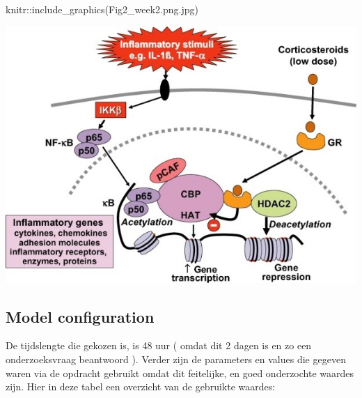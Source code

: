 \documentclass[
]{article}
\newenvironment{Shaded}{\begin{snugshade}}{\end{snugshade}}
\newcommand{\FunctionTok}[1]{\textcolor[rgb]{0.00,0.00,0.00}{#1}}
\newcommand{\NormalTok}[1]{#1}
\newcommand{\SpecialCharTok}[1]{\textcolor[rgb]{0.00,0.00,0.00}{#1}}
\newcommand{\StringTok}[1]{\textcolor[rgb]{0.31,0.60,0.02}{#1}}
\begin{document}
\begin{Shaded}
\begin{Highlighting}[]
\NormalTok{knitr}\SpecialCharTok{::}\FunctionTok{include\_graphics}\NormalTok{(}\StringTok{\textquotesingle{}Fig2\_week2.png.jpg\textquotesingle{}}\NormalTok{)}
\end{Highlighting}
\end{Shaded}

\includegraphics{Fig2_week2.png.jpg}

\hypertarget{model-configuration}{%
\subsection{Model configuration}\label{model-configuration}}

De tijdslengte die gekozen is, is 48 uur ( omdat dit 2 dagen is en zo
een onderzoeksvraag beantwoord ). Verder zijn de parameters en values
die gegeven waren via de opdracht gebruikt omdat dit feitelijke, en goed
onderzochte waardes zijn. Hier in deze tabel een overzicht van de
gebruikte waardes:
\end{document}
